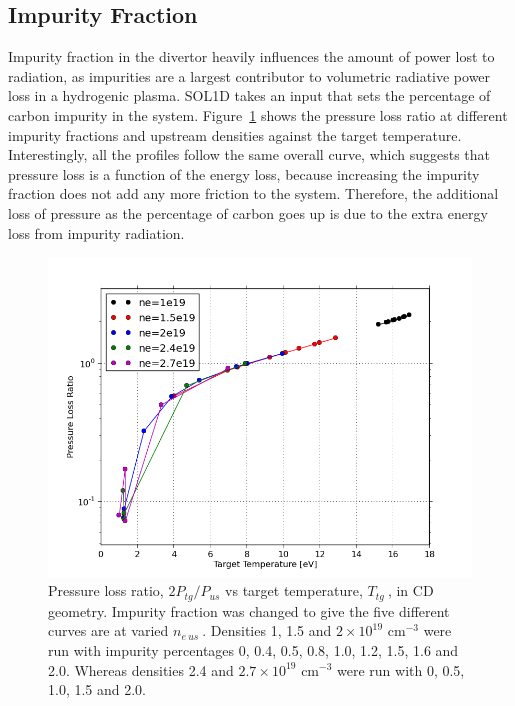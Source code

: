 \documentclass[12pt]{article}  %
\providecommand{\noNe}[1]{{${#1}\times 10^{19}$ cm$^{-3}$}} %
\providecommand{\neus}{$n_{e~us}~$} %
\providecommand{\Ttg}{$T_{tg}~$} %
\begin{document}
\subsection{Impurity Fraction}\label{ssecImpfrac}
Impurity fraction in the divertor heavily influences the amount of power lost to radiation, as impurities are a largest contributor to volumetric radiative power loss in a hydrogenic plasma. SOL1D takes an input that sets the percentage of carbon impurity in the system. Figure~\ref{figCvarPL5nes} shows the pressure loss ratio at different impurity fractions and upstream densities against the target temperature. Interestingly, all the profiles follow the same overall curve, which suggests that pressure loss is a function of the energy loss, because increasing the impurity fraction does not add any more friction to the system. Therefore, the additional loss of pressure as the percentage of carbon goes up is due to the extra energy loss from impurity radiation.

\begin{figure}
\includegraphics[scale=0.5]{Figures/sol1d/CvarPL5nes.png}
\centering
\caption{Pressure loss ratio, $2P_{tg}/P_{us}$ vs target temperature, \Ttg, in CD geometry. Impurity fraction was changed to give the five different curves are at varied \neus. Densities 1, 1.5 and \noNe{2} were run with impurity percentages 0, 0.4, 0.5, 0.8, 1.0, 1.2, 1.5, 1.6 and 2.0. Whereas densities 2.4 and \noNe{2.7} were run with 0, 0.5, 1.0, 1.5 and 2.0.}\label{figCvarPL5nes}
\end{figure}
\end{document}
